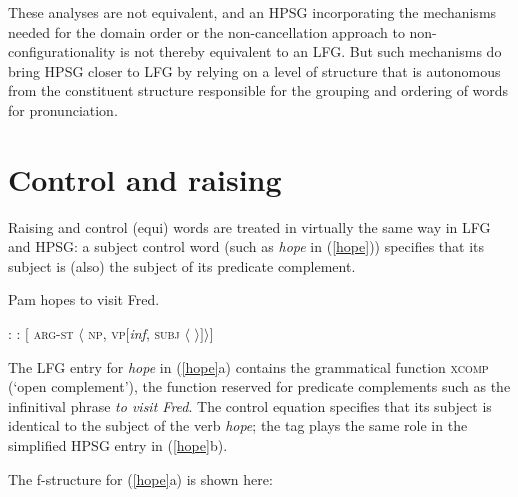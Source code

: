 \begin{sloppypar}
These analyses are not equivalent, and an HPSG incorporating the mechanisms needed for the domain order or the non-cancellation approach to non-configurationality is not thereby equivalent to an LFG.  But such mechanisms do bring HPSG closer to LFG by relying on a level of structure that is autonomous from the constituent structure responsible for the grouping and ordering of words for pronunciation.  
\end{sloppypar}

\section{Control and raising}

Raising and control (equi) words are treated in virtually the same way in LFG and HPSG: a subject control word (such as \textit{hope} in (\ref{hope})) specifies that its subject is (also) the subject of its predicate complement.  

\begin{exe} 
\ex	\label{hope}
Pam hopes to visit Fred.
\begin{xlist} 
\ex	
{}: \qquad {}
\ex 
{}:  \qquad  $[$ \textsc{arg-st} $\langle$ \textsc{np}, \textsc{vp}[\textit{inf}, \textsc{subj} $\langle$  $ \rangle ] \rangle ]$
\end{xlist}
\end{exe}
The LFG entry for \textit{hope} in (\ref{hope}a) contains the grammatical function \textsc{xcomp} (`open complement'), the function reserved for predicate complements such as the infinitival phrase \textit{to visit Fred}.  The control equation specifies that its subject is identical to the subject of the verb \textit{hope}; the  tag  plays the same role in the simplified HPSG entry in (\ref{hope}b).  

The f-structure for (\ref{hope}a) is shown here:

\begin{exe}
\ex \label{hopefs} 
{
}
\end{exe}

